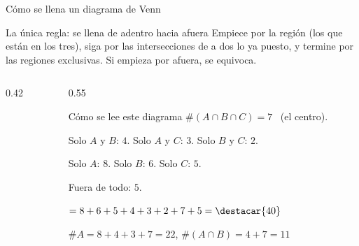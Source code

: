 \documentclass[aspectratio=169,10pt]{beamer}
\begin{document}
\begin{frame}{Cómo se llena un diagrama de Venn}
  \scriptsize
  \begin{alertblock}{La única regla: se llena de adentro hacia afuera}
    \tiny
    Empiece por la región  (los que están en los tres), siga
    por las intersecciones de a dos  lo ya puesto, y termine
    por las regiones exclusivas. Si empieza por afuera, se equivoca.
  \end{alertblock}

  \vspace{0.1cm}
  \begin{columns}[T,onlytextwidth]
    \begin{column}{0.42\textwidth}
      \begin{center}
      \end{center}
    \end{column}
    \begin{column}{0.55\textwidth}
      \begin{block}{Cómo se lee este diagrama}
        \tiny
        $\#(A\cap B\cap C) = 7$ \ (el centro).

        Solo $A$ y $B$: $4$. \quad Solo $A$ y $C$: $3$. \quad
        Solo $B$ y $C$: $2$.

        Solo $A$: $8$. \quad Solo $B$: $6$. \quad Solo $C$: $5$.

        Fuera de todo: $5$.

        \vspace{0.06cm}
         $= 8+6+5+4+3+2+7+5 = \destacar{40}$

        \vspace{0.04cm}
        $\#A = 8+4+3+7 = 22$, \quad
        $\#(A\cap B) = 4+7 = 11$
      \end{block}
    \end{column}
  \end{columns}
\end{frame}
\end{document}
